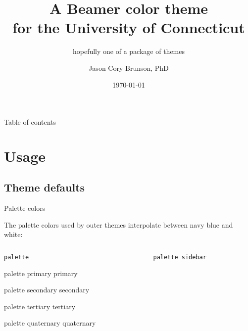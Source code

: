 \documentclass{beamer}
\title[Beamer colors for UConn]{A Beamer color theme\\ for the University of Connecticut}
\subtitle{hopefully one of a package of themes}
\author[Cory Brunson]{Jason Cory Brunson, PhD}
\institute[UConn Health]{Center for Quantitative Medicine\\ University of Connecticut School of Medicine}
\date{\today}
\begin{document}
\begin{frame}
\titlepage
\end{frame}


\begin{frame}{Table of contents}
\tableofcontents
\end{frame}


\section{Usage}

\subsection{Theme defaults}

\begin{frame}[fragile]{Palette colors}

The palette colors used by outer themes interpolate between navy blue and white:

\vfill

\begin{columns}
\begin{column}{.5\textwidth}

\centering
\verb|palette|
\vspace{1ex}

\begin{beamercolorbox}[sep=4pt,center]{palette primary}
primary
\end{beamercolorbox}

\begin{beamercolorbox}[sep=4pt,center]{palette secondary}
secondary
\end{beamercolorbox}

\begin{beamercolorbox}[sep=4pt,center]{palette tertiary}
tertiary
\end{beamercolorbox}

\begin{beamercolorbox}[sep=4pt,center]{palette quaternary}
quaternary
\end{beamercolorbox}

\end{column}
\begin{column}{.5\textwidth}

\centering
\verb|palette sidebar|
\vspace{1ex}


\end{column}
\end{columns}
\end{frame}
\end{document}
